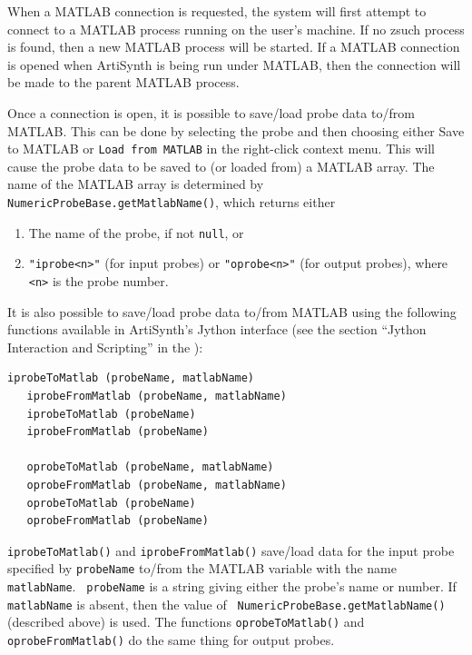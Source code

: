 \documentclass{article}
\begin{document}
\begin{sideblock}
When a MATLAB connection is requested, the system will first attempt
to connect to a MATLAB process running on the user's machine. If no
zsuch process is found, then a new MATLAB process will be started.  If
a MATLAB connection is opened when ArtiSynth is being run under
MATLAB, then the connection will be made to the parent MATLAB process.
\end{sideblock}

Once a connection is open, it is possible to save/load probe data
to/from MATLAB. This can be done by selecting the probe and then
choosing either {\sf Save to MATLAB} or {\tt Load from MATLAB} in the
right-click context menu. This will cause the probe data to be saved
to (or loaded from) a MATLAB array. The name of the MATLAB array is
determined by {\tt NumericProbeBase.getMatlabName()}, which returns
either

\begin{enumerate}

\item The name of the probe, if not {\tt null}, or

\item {\tt "iprobe<n>"} (for input probes) or {\tt "oprobe<n>"} (for
output probes), where {\tt <n>} is the probe number.

\end{enumerate}

It is also possible to save/load probe data to/from MATLAB using the
following functions available in ArtiSynth's Jython interface (see the
section ``Jython Interaction and Scripting'' in the
):
%
\begin{lstlisting}[]
   iprobeToMatlab (probeName, matlabName)
   iprobeFromMatlab (probeName, matlabName)
   iprobeToMatlab (probeName)
   iprobeFromMatlab (probeName)

   oprobeToMatlab (probeName, matlabName)
   oprobeFromMatlab (probeName, matlabName)
   oprobeToMatlab (probeName)
   oprobeFromMatlab (probeName)
\end{lstlisting}
%
{\tt iprobeToMatlab()} and {\tt iprobeFromMatlab()}
save/load data for the input probe specified by {\tt probeName}
to/from the MATLAB variable with the name {\tt matlabName}. {\tt
probeName} is a string giving either the probe's name or number.  If
{\tt matlabName} is absent, then the value of {\tt
NumericProbeBase.getMatlabName()} (described above) is used.  The
functions {\tt oprobeToMatlab()} and {\tt oprobeFromMatlab()} do the
same thing for output probes.
\end{document}
